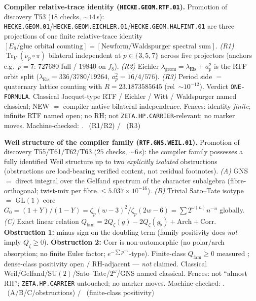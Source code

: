 \documentclass[11pt,a4paper]{article}
\begin{document}
\par\smallskip\noindent\textbf{Compiler relative-trace identity
(\texttt{HECKE.GEOM.RTF.01}).}
Promotion of discovery T53 ($18$ checks, $\sim14$\,s):
\texttt{HECKE.GEOM.01}/\texttt{HECKE.GEOM.EICHLER.01}/\texttt{HECKE.GEOM.HALFINT.01}
are three projections of one finite relative-trace identity
$[\text{$E_8$/glue orbital counting}]=[\text{Newform/Waldspurger spectral sum}]$.
\emph{(R1)} $\operatorname{Tr}_V(\nu_p\circ\pi)$ bilateral independent at
$p\in\{3,5,7\}$ across five projectors (anchors e.g.\ $p{=}7$: $727680$ full /
$19840$ on $f_8$).
\emph{(R2)} Eichler $\lambda_{\mathrm{geom}}=\lambda_{\mathrm{Eis}}+a_p^2$ is the RTF
orbit split ($\lambda_{\mathrm{Eis}}=336/3780/19264$, $a_p^2=16/4/576$).
\emph{(R3)} Period side $=$ quaternary lattice counting with
$R=23.1873585645$ (rel~$\sim10^{-12}$). Verdict \texttt{ONE-FORMULA}.
Classical Jacquet-type RTF / Eichler / Witt / Waldspurger named classical; NEW $=$
compiler-native bilateral independence. Fences: identity \emph{finite}; infinite RTF
named open; no RH; not \texttt{ZETA.HP.CARRIER}-relevant; no marker moves.
Machine-checked: .
\mE\ (R1/R2) / \mC\ (R3)

\par\smallskip\noindent\textbf{Weil structure of the compiler family
(\texttt{RTF.GNS.WEIL.01}).}
Promotion of discovery T55/T61/T62/T63 ($25$ checks, $\sim6$\,s): the compiler family
possesses a fully identified Weil structure up to two \emph{explicitly isolated}
obstructions (obstructions are load-bearing verified content, not residual footnotes).
\emph{(A)} GNS $=$ direct integral over the Gelfand spectrum of the character subalgebra
(fibre-orthogonal; twist-mix per fibre $\le5.037\times10^{-16}$).
\emph{(B)} Trivial Sato--Tate isotype $=$ GL$(1)$ core
$G_0=(1+Y)/(1-Y)=\zeta_p(w-3)^2/\zeta_p(2w-6)=\sum 2^{\omega(n)}n^{-u}$ globally.
\emph{(C)} Exact linear relation
$Q_{\mathrm{fam}}=2Q_\zeta(g)-2Q_\zeta(g_\flat)+\mathrm{Arch}+\mathrm{Corr}$.
\textbf{Obstruction 1:} minus sign on the doubling term
(family positivity does \emph{not} imply $Q_\zeta\ge0$).
\textbf{Obstruction 2:} Corr is non-automorphic
(no polar/arch absorption; no finite Euler factor; $e^{-\sum p^{-u}}$-type).
Finite-class $Q_{\mathrm{fam}}\ge0$ measured \mC; dense-class positivity open /
RH-adjacent --- \emph{not} claimed. Classical Weil/Gelfand/SU$(2)$/Sato--Tate/$2^\omega$/GNS
named classical. Fences: not ``almost RH''; \texttt{ZETA.HP.CARRIER} untouched;
no marker moves.
Machine-checked: .
\mE\ (A/B/C/obstructions) / \mC\ (finite-class positivity)
\end{document}

